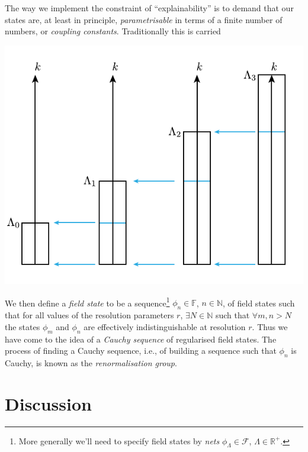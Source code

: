 \documentclass[11pt]{amsart}
\theoremstyle{plain}%
\theoremstyle{definition}
\theoremstyle{remark}
\begin{document}
The way we implement the constraint of ``explainability'' is to demand that our states are, at least in principle, \emph{parametrisable} in terms of a finite number of numbers, or \emph{coupling constants}. Traditionally this is carried 

\begin{center}
\includegraphics{rginverse.pdf}
\end{center}



We then define a \emph{field state} to be a sequence\footnote{More generally we'll need to specify field states by \emph{nets} $\phi_\Lambda \in \mathcal{F}$, $\Lambda\in\mathbb{R}^+$.} $\phi_n\in\mathbb{F}$, $n\in\mathbb{N}$, of field states such that for all values of the resolution parameters $r$, $\exists N\in \mathbb{N}$ such that $\forall m,n > N$ the states $\phi_m$ and $\phi_n$ are effectively indistinguishable at resolution $r$. Thus we have come to the idea of a \emph{Cauchy sequence} of regularised field states. The process of finding a Cauchy sequence, i.e., of building a sequence such that $\phi_n$ is Cauchy, is known as the \emph{renormalisation group}.

\section{Discussion}\label{sec:discussion}






\end{document}
